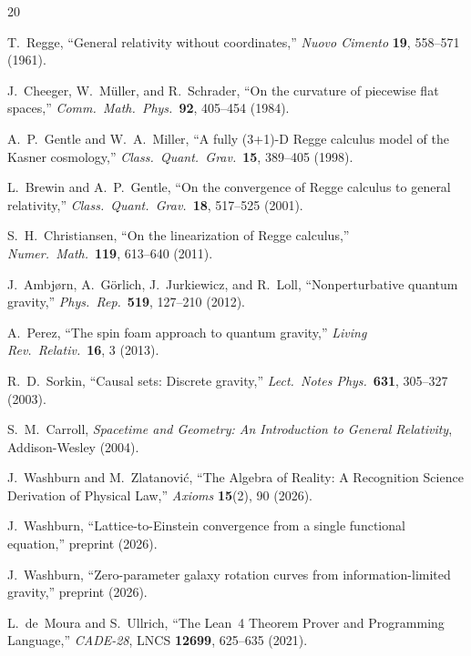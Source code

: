 \documentclass[11pt,a4paper]{article}
\begin{document}
\begin{thebibliography}{20}

 T.~Regge, ``General relativity without coordinates,''
\textit{Nuovo Cimento} \textbf{19}, 558--571 (1961).

 J.~Cheeger, W.~M\"uller, and R.~Schrader,
``On the curvature of piecewise flat spaces,''
\textit{Comm.\ Math.\ Phys.}\ \textbf{92}, 405--454 (1984).

 A.~P.~Gentle and W.~A.~Miller,
``A fully (3+1)-D Regge calculus model of the Kasner cosmology,''
\textit{Class.\ Quant.\ Grav.}\ \textbf{15}, 389--405 (1998).

 L.~Brewin and A.~P.~Gentle,
``On the convergence of Regge calculus to general relativity,''
\textit{Class.\ Quant.\ Grav.}\ \textbf{18}, 517--525 (2001).

 S.~H.~Christiansen,
``On the linearization of Regge calculus,''
\textit{Numer.\ Math.}\ \textbf{119}, 613--640 (2011).

 J.~Ambj\o{}rn, A.~G\"orlich, J.~Jurkiewicz, and R.~Loll,
``Nonperturbative quantum gravity,''
\textit{Phys.\ Rep.}\ \textbf{519}, 127--210 (2012).

 A.~Perez, ``The spin foam approach to quantum gravity,''
\textit{Living Rev.\ Relativ.}\ \textbf{16}, 3 (2013).

 R.~D.~Sorkin, ``Causal sets: Discrete gravity,''
\textit{Lect.\ Notes Phys.}\ \textbf{631}, 305--327 (2003).

 S.~M.~Carroll, \textit{Spacetime and Geometry: An Introduction to General Relativity},
Addison-Wesley (2004).

 J.~Washburn and M.~Zlatanovi\'{c},
``The Algebra of Reality: A Recognition Science Derivation of Physical Law,''
\textit{Axioms} \textbf{15}(2), 90 (2026).

 J.~Washburn,
``Lattice-to-Einstein convergence from a single functional equation,''
preprint (2026).

 J.~Washburn,
``Zero-parameter galaxy rotation curves from information-limited gravity,''
preprint (2026).

 L.~de~Moura and S.~Ullrich,
``The Lean~4 Theorem Prover and Programming Language,''
\textit{CADE-28}, LNCS \textbf{12699}, 625--635 (2021).


\end{thebibliography}
\end{document}

